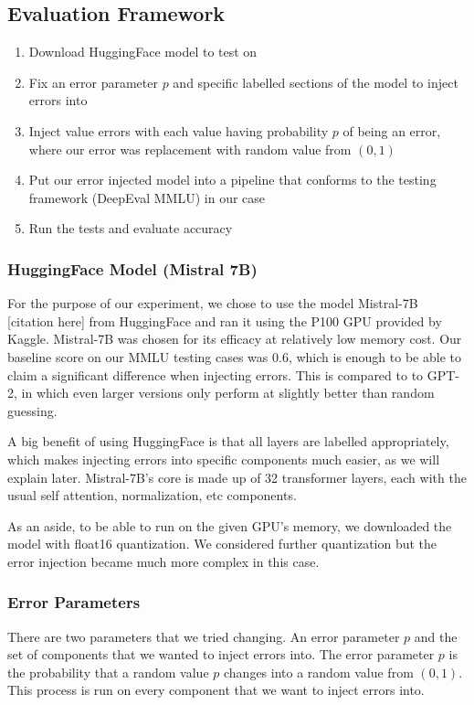 \subsection{Evaluation Framework}
\begin{enumerate}
    \item Download HuggingFace model to test on
    \item Fix an error parameter $p$ and specific labelled sections of the model to inject errors into
    \item Inject value errors with each value having probability $p$ of being an error, where our error was replacement with random value from $(0, 1)$
    \item Put our error injected model into a pipeline that conforms to the testing framework (DeepEval MMLU) in our case
    \item Run the tests and evaluate accuracy
\end{enumerate}

\subsubsection{HuggingFace Model (Mistral 7B)}
For the purpose of our experiment, we chose to use the model Mistral-7B [citation here] from HuggingFace and ran it using the P100 GPU provided by Kaggle.
Mistral-7B was chosen for its efficacy at relatively low memory cost. Our baseline score on our MMLU testing cases was 0.6, which is enough to be able to claim a significant difference
when injecting errors. This is compared to to GPT-2, in which even larger versions only perform at slightly better than random guessing.

A big benefit of using HuggingFace is that all layers are labelled appropriately, which makes injecting errors into specific components much easier, as we will explain later. Mistral-7B's core is made up of
32 transformer layers, each with the usual self attention, normalization, etc components.

As an aside, to be able to run on the given GPU's memory, we downloaded the model with float16 quantization. We considered further quantization but
the error injection became much more complex in this case.

\subsubsection{Error Parameters}
There are two parameters that we tried changing. An error parameter $p$ and the set of components that we wanted to inject errors into. The error parameter $p$
is the probability that a random value $p$ changes into a random value from $(0, 1)$. This process is run on every component that we want to inject errors into.

